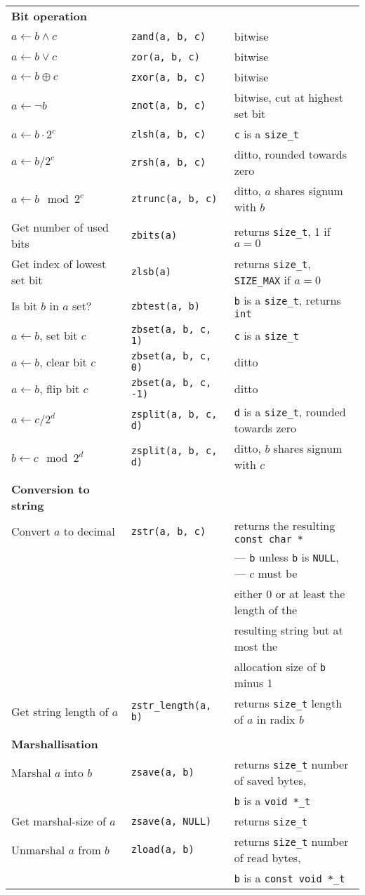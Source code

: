 \documentclass[10pt,draft]{article}
\newcommand{\size}{{\tt size\_t}}
\newcommand{\ullong}{{\tt unsigned long long int}}
\newcommand{\entry}[3]{ #2 & {\tt #1} & #3 \\ }
\newcommand{\cont}[1]{ & & #1 \\ }
\begin{document}
\begin{tabular}{lll}



\textbf{Bit operation} \\
\entry{zand(a, b, c)}      {$a \gets b \wedge c$}         {bitwise}
\entry{zor(a, b, c)}       {$a \gets b \vee c$}           {bitwise}
\entry{zxor(a, b, c)}      {$a \gets b \oplus c$}         {bitwise}
\entry{znot(a, b, c)}      {$a \gets \lnot b$}            {bitwise, cut at highest set bit}
\entry{zlsh(a, b, c)}      {$a \gets b \cdot 2^c$}        {{\tt c} is a \size{}}
\entry{zrsh(a, b, c)}      {$a \gets b / 2^c$}            {ditto, rounded towards zero}
\entry{ztrunc(a, b, c)}    {$a \gets b \mod 2^c$}         {ditto, $a$ shares signum with $b$}
\entry{zbits(a)}           {Get number of used bits}      {returns \size{}, 1 if $a = 0$}
\entry{zlsb(a)}            {Get index of lowest set bit}  {returns \size{}, {\tt SIZE\_MAX} if $a = 0$}
\entry{zbtest(a, b)}       {Is bit $b$ in $a$ set?}       {{\tt b} is a \size{}, returns {\tt int}}
\entry{zbset(a, b, c, 1)}  {$a \gets b$, set bit $c$}     {{\tt c} is a \size{}}
\entry{zbset(a, b, c, 0)}  {$a \gets b$, clear bit $c$}   {ditto}
\entry{zbset(a, b, c, -1)} {$a \gets b$, flip bit $c$}    {ditto}
\entry{zsplit(a, b, c, d)} {$a \gets c / 2^d$}            {{\tt d} is a \size{}, rounded towards zero}
\entry{zsplit(a, b, c, d)} {$b \gets c \mod 2^d$}         {ditto, $b$ shares signum with $c$}
\\

\textbf{Conversion to string} \\
\entry{zstr(a, b, c)}           {Convert $a$ to decimal}   {returns the resulting {\tt const char *}}
\cont                                                      {--- {\tt b} unless {\tt b} is
                                                                {\tt NULL}, --- $c$ must be}
\cont                                                      {either 0 or at least the length of the}
\cont                                                      {resulting string but at most the}
\cont                                                      {allocation size of {\tt b} minus 1}
\entry{zstr\_length(a, b)}      {Get string length of $a$} {returns \size{} length of $a$ in radix $b$}
\\

\textbf{Marshallisation} \\
\entry{zsave(a, b)}    {Marshal $a$ into $b$}    {returns \size{} number of saved bytes,}
\cont                                            {{\tt b} is a {\tt void *\_t}}
\entry{zsave(a, NULL)} {Get marshal-size of $a$} {returns \size{}}
\entry{zload(a, b)}    {Unmarshal $a$ from $b$}  {returns \size{} number of read bytes,}
\cont                                            {{\tt b} is a {\tt const void *\_t}}


\end{tabular}
\end{document}
